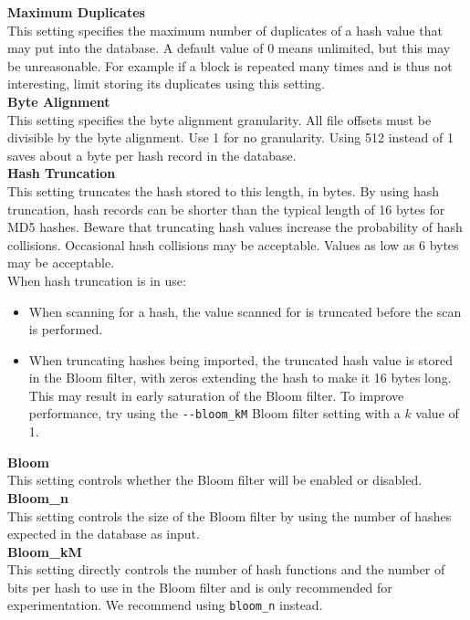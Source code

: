 \documentclass[11pt,fleqn]{article} %
\begin{document}
\textbf{Maximum Duplicates}\\
This setting specifies the maximum number of duplicates of a hash value
that \hash may put into the database.
A default value of 0 means unlimited, but this may be unreasonable.
For example if a block is repeated many times and is thus not interesting,
limit storing its duplicates using this setting.\\

\textbf{Byte Alignment}\\
This setting specifies the byte alignment granularity.  All file offsets must be divisible by the byte alignment.  Use 1 for no granularity.  Using 512 instead of 1 saves about a byte per hash record in the database.\\

\textbf{Hash Truncation}\\
This setting truncates the hash stored to this length, in bytes.  By using hash truncation, hash records can be shorter than the typical length of 16 bytes for MD5 hashes.  Beware that truncating hash values increase the probability of hash collisions.  Occasional hash collisions may be acceptable.  Values as low as 6 bytes may be acceptable.\\
When hash truncation is in use:
\begin{itemize}
\item When scanning for a hash, the value scanned for is truncated before the scan is performed.
\item When truncating hashes being imported, the truncated hash value is stored in the Bloom filter, with zeros extending the hash to make it 16 bytes long.  This may result in early saturation of the Bloom filter.  To improve performance, try using the \verb+--bloom_kM+ Bloom filter setting with a $k$ value of 1.
\end{itemize}

\textbf{Bloom}\\
This setting controls whether the Bloom filter will be enabled or disabled. \\

\textbf{Bloom\_n}\\
This setting controls the size of the Bloom filter by using the number of hashes expected in the database as input. \\

\textbf{Bloom\_kM}\\
This setting directly controls the number of hash functions and the number of bits per hash to use in the Bloom filter and is only recommended for experimentation.  We recommend using \verb+bloom_n+ instead.\\
\end{document}
